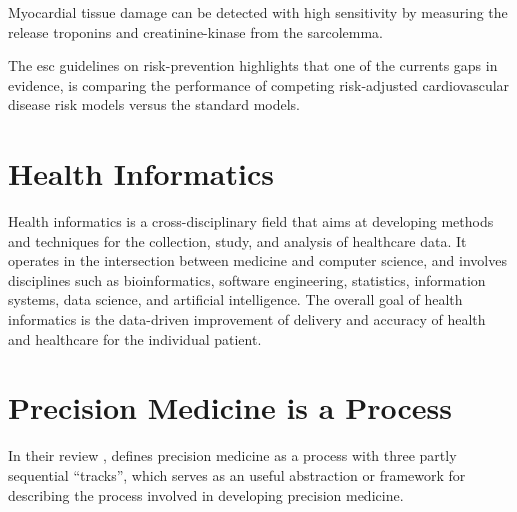 

Myocardial tissue damage can be detected with high sensitivity by measuring 
the release troponins and creatinine-kinase from the sarcolemma.
~\autocite{falkPathogenesis2006}

The esc guidelines on risk-prevention highlights 
that one of the currents gaps in evidence,
is comparing the performance of competing risk-adjusted 
cardiovascular disease risk models versus the standard models.
~\autocite{visseren20212021}




\section{Health Informatics}

Health informatics is a cross-disciplinary field
that aims at developing methods and techniques
for the collection, study, and analysis of healthcare data.
It operates in the intersection between medicine and computer science,
and involves disciplines such as
bioinformatics, software engineering, statistics, information systems,
data science, and artificial intelligence.
The overall goal of health informatics is the data-driven improvement
of delivery and accuracy of health and healthcare for the individual patient.

\section{Precision Medicine is a Process}

In their review 
, 
\citeauthor{konigWhat2017} defines precision medicine as 
a process with three partly sequential \enquote{tracks},
which serves as an useful abstraction or framework 
for describing the process involved in developing precision medicine.
~\autocite{konigWhat2017} 




